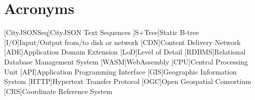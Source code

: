 
\chapter*{Acronyms}

\begin{acronym}[UML]
  [CityJSONSeq]{CityJSON Text Sequences}
  [S+Tree]{Static B-tree}
  [I/O]{Input/Output from/to disk or network}
  [CDN]{Content Delivery Network}
  [ADE]{Application Domain Extension}
  [LoD]{Level of Detail}
  [RDBMS]{Relational Database Management System}
  [WASM]{WebAssembly}
  [CPU]{Central Processing Unit}
  [API]{Application Programming Interface}
  [GIS]{Geographic Information System}
  [HTTP]{Hypertext Transfer Protocol}
  [OGC]{Open Geospatial Consortium}
  [CRS]{Coordinate Reference System}
\end{acronym}